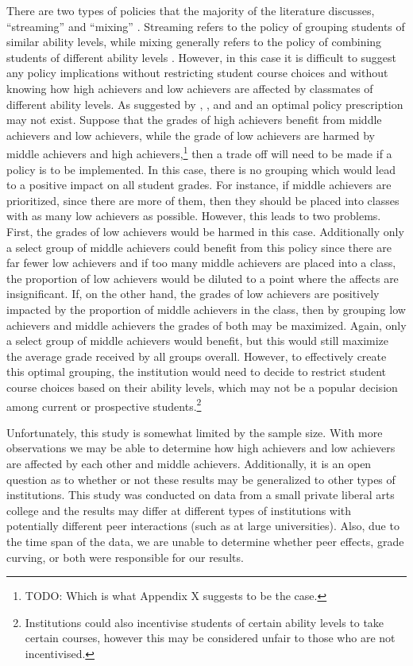 There are two types of policies that the majority of the literature discusses, ``streaming'' and ``mixing'' \citep{ding2007peers,kang2007classroom,carman2012classroom}. 
Streaming refers to the policy of grouping students of similar ability levels, while mixing generally refers to the policy of combining students of different ability levels \citep{ding2007peers}.
However, in this case it is difficult to suggest any policy implications without restricting student course choices and without knowing how high achievers and low achievers are affected by classmates of different ability levels. 
As suggested by \citet{burke2013classroom}, \citet{carman2012classroom}, and \citet{ding2007peers} and an optimal policy prescription may not exist.
Suppose that the grades of high achievers benefit from middle achievers and low achievers, while the grade of low achievers are harmed by middle achievers and high achievers,\footnote{TODO: Which is what Appendix X suggests to be the case.} then a trade off will need to be made if a policy is to be implemented. 
In this case, there is no grouping which would lead to a positive impact on all student grades. 
For instance, if middle achievers are prioritized, since there are more of them, then they should be placed into classes with as many low achievers as possible. 
However, this leads to two problems.
First, the grades of low achievers would be harmed in this case.
Additionally only a select group of middle achievers could benefit from this policy since there are far fewer low achievers and if too many middle achievers are placed into a class, the proportion of low achievers would be diluted to a point where the affects are insignificant. 
If, on the other hand, the grades of low achievers are positively impacted by the proportion of middle achievers in the class, then by grouping low achievers and middle achievers the grades of both may be maximized.
Again, only a select group of middle achievers would benefit, but this would still maximize the average grade received by all groups overall.
However, to effectively create this optimal grouping, the institution would need to decide to restrict student course choices based on their ability levels, which may not be a popular decision among current or prospective students.\footnote{Institutions could also incentivise students of certain ability levels to take certain courses, however this may be considered unfair to those who are not incentivised.}

Unfortunately, this study is somewhat limited by the sample size. 
With more observations we may be able to determine how high achievers and low achievers are affected by each other and middle achievers.
Additionally, it is an open question as to whether or not these results may be generalized to other types of institutions. 
This study was conducted on data from a small private liberal arts college and the results may differ at different types of institutions with potentially different peer interactions (such as at large universities). 
Also, due to the time span of the data, we are unable to determine whether peer effects, grade curving, or both were responsible for our results. 

